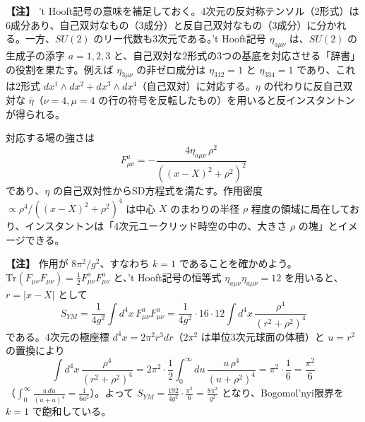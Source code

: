 \documentclass[uplatex, dvipdfmx, book]{jsbook}
\newenvironment{note}{\vspace{1ex}\par\footnotesize\noindent\textbf{【注】}}{\par\vspace{1ex}}
\begin{document}
\begin{note}
't Hooft記号の意味を補足しておく。4次元の反対称テンソル（2形式）は6成分あり、自己双対なもの（3成分）と反自己双対なもの（3成分）に分かれる。一方、$SU(2)$ のリー代数も3次元である。't Hooft記号 $\eta_{a\mu\nu}$ は、$SU(2)$ の生成子の添字 $a = 1, 2, 3$ と、自己双対な2形式の3つの基底を対応させる「辞書」の役割を果たす。例えば $\eta_{3\mu\nu}$ の非ゼロ成分は $\eta_{312} = 1$ と $\eta_{334} = 1$ であり、これは2形式 $dx^1 \wedge dx^2 + dx^3 \wedge dx^4$（自己双対）に対応する。$\eta$ の代わりに反自己双対な $\bar{\eta}$（$\nu = 4, \mu = 4$ の行の符号を反転したもの）を用いると反インスタントンが得られる。
\end{note}

対応する場の強さは
\begin{equation}
    F^a_{\mu\nu} = -\frac{4 \eta_{a\mu\nu}\, \rho^2}{\left( (x - X)^2 + \rho^2 \right)^2}
\end{equation}
であり、$\eta$ の自己双対性からSD方程式を満たす。作用密度 $\propto \rho^4/((x-X)^2 + \rho^2)^4$ は中心 $X$ のまわりの半径 $\rho$ 程度の領域に局在しており、インスタントンは「4次元ユークリッド時空の中の、大きさ $\rho$ の塊」とイメージできる。

\begin{note}
作用が $8\pi^2/g^2$、すなわち $k = 1$ であることを確かめよう。$\mathrm{Tr}(F_{\mu\nu}F_{\mu\nu}) = \frac{1}{2}F^a_{\mu\nu}F^a_{\mu\nu}$ と、't Hooft記号の恒等式 $\eta_{a\mu\nu}\eta_{a\mu\nu} = 12$ を用いると、$r = |x - X|$ として
\begin{equation*}
    S_{YM} = \frac{1}{4g^2}\int d^4x\, F^a_{\mu\nu}F^a_{\mu\nu} = \frac{1}{4g^2} \cdot 16 \cdot 12 \int d^4x\, \frac{\rho^4}{(r^2 + \rho^2)^4}
\end{equation*}
である。4次元の極座標 $d^4x = 2\pi^2 r^3 dr$（$2\pi^2$ は単位3次元球面の体積）と $u = r^2$ の置換により
\begin{equation*}
    \int d^4x\, \frac{\rho^4}{(r^2 + \rho^2)^4} = 2\pi^2 \cdot \frac{1}{2}\int_0^\infty du\, \frac{u\, \rho^4}{(u + \rho^2)^4} = \pi^2 \cdot \frac{1}{6} = \frac{\pi^2}{6}
\end{equation*}
（$\int_0^\infty \frac{u\, du}{(u + a)^4} = \frac{1}{6a^2}$）。よって $S_{YM} = \frac{192}{4g^2}\cdot\frac{\pi^2}{6} = \frac{8\pi^2}{g^2}$ となり、Bogomol'nyi限界を $k = 1$ で飽和している。
\end{note}
\end{document}
